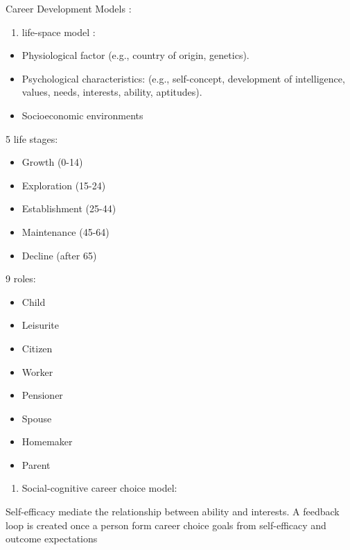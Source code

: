 \documentclass[
]{book}
\providecommand{\tightlist}{%
  \setlength{\itemsep}{0pt}\setlength{\parskip}{0pt}}
\begin{document}
Career Development Models :

\begin{enumerate}
\def\labelenumi{\arabic{enumi}.}
\tightlist
\item
  life-space model \citep{Vondracek_2019}:
\end{enumerate}

\begin{itemize}
\tightlist
\item
  Physiological factor (e.g., country of origin, genetics).
\item
  Psychological characteristics: (e.g., self-concept, development of intelligence, values, needs, interests, ability,
  aptitudes).
\item
  Socioeconomic environments
\end{itemize}

5 life stages:

\begin{itemize}
\tightlist
\item
  Growth (0-14)
\item
  Exploration (15-24)
\item
  Establishment (25-44)
\item
  Maintenance (45-64)
\item
  Decline (after 65)
\end{itemize}

9 roles:

\begin{itemize}
\tightlist
\item
  Child
\item
  Leisurite
\item
  Citizen
\item
  Worker
\item
  Pensioner
\item
  Spouse
\item
  Homemaker
\item
  Parent
\end{itemize}

\begin{enumerate}
\def\labelenumi{\arabic{enumi}.}
\setcounter{enumi}{1}
\tightlist
\item
  Social-cognitive career choice model: \citep{Lent_1994}
\end{enumerate}

Self-efficacy mediate the relationship between ability and interests. A feedback loop is created once a person form
career choice goals from self-efficacy and outcome expectations
\end{document}
